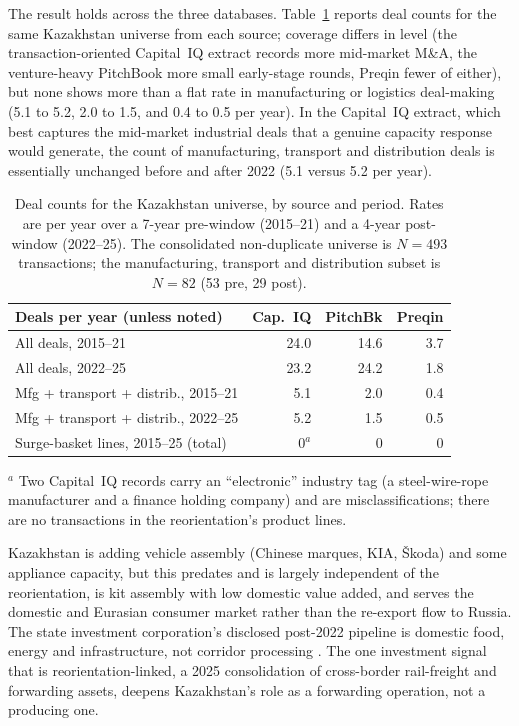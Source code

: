 \documentclass[12pt]{article}
\begin{document}
The result holds across the three databases. Table~\ref{tab:dealsource} reports deal counts
for the same Kazakhstan universe from each source; coverage differs in level (the
transaction-oriented Capital~IQ extract records more mid-market M\&A, the venture-heavy
PitchBook more small early-stage rounds, Preqin fewer of either), but none shows more than a
flat rate in manufacturing or logistics deal-making (5.1 to 5.2, 2.0 to 1.5, and 0.4 to 0.5
per year). In the Capital~IQ extract, which best
captures the mid-market industrial deals that a genuine capacity response would generate, the
count of manufacturing, transport and distribution deals is essentially unchanged before and
after 2022 (5.1 versus 5.2 per year).

\begin{table}[t]
\centering
\caption{Deal counts for the Kazakhstan universe, by source and period. Rates are per year
over a 7-year pre-window (2015--21) and a 4-year post-window (2022--25). The consolidated
non-duplicate universe is $N = 493$ transactions; the manufacturing, transport and
distribution subset is $N = 82$ (53 pre, 29 post).}
\label{tab:dealsource}
\footnotesize
\begin{tabular}{lrrr}
\toprule
Deals per year (unless noted) & Cap.~IQ & PitchBk & Preqin \\
\midrule
All deals, 2015--21              & 24.0 & 14.6 & 3.7 \\
All deals, 2022--25              & 23.2 & 24.2 & 1.8 \\
Mfg + transport + distrib., 2015--21 & 5.1 & 2.0 & 0.4 \\
Mfg + transport + distrib., 2022--25 & 5.2 & 1.5 & 0.5 \\
Surge-basket lines, 2015--25 (total) & 0$^{a}$ & 0 & 0 \\
\bottomrule
\end{tabular}

\vspace{2pt}
\footnotesize $^{a}$ Two Capital~IQ records carry an ``electronic'' industry tag (a
steel-wire-rope manufacturer and a finance holding company) and are misclassifications; there
are no transactions in the reorientation's product lines.
\end{table}

Kazakhstan is adding vehicle assembly (Chinese marques, KIA, \v{S}koda) and some appliance
capacity, but this predates and is largely independent of the reorientation, is kit assembly
with low domestic value added, and serves the domestic and Eurasian consumer market rather
than the re-export flow to Russia. The state investment corporation's disclosed
post-2022 pipeline is domestic food, energy and infrastructure, not corridor processing
\citep{qicaifcifc2026pe}. The one
investment signal that is reorientation-linked, a 2025 consolidation of cross-border
rail-freight and forwarding assets, deepens Kazakhstan's role as a forwarding operation, not
a producing one.
\end{document}

